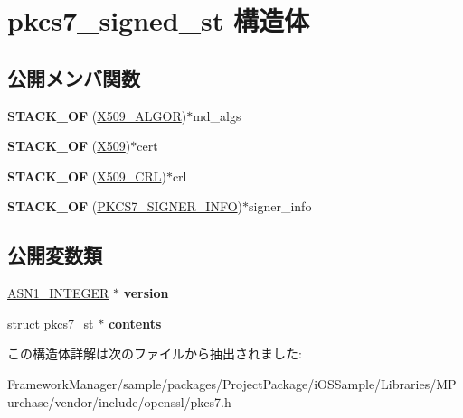 \hypertarget{structpkcs7__signed__st}{}\section{pkcs7\+\_\+signed\+\_\+st 構造体}
\label{structpkcs7__signed__st}
\subsection*{公開メンバ関数}
\begin{DoxyCompactItemize}
\item 
\hypertarget{structpkcs7__signed__st_a95443d219319ec0509277c13ada0d372}{}{\bfseries S\+T\+A\+C\+K\+\_\+\+O\+F} (\hyperlink{struct_x509__algor__st}{X509\+\_\+\+A\+L\+G\+O\+R})$\ast$md\+\_\+algs\label{structpkcs7__signed__st_a95443d219319ec0509277c13ada0d372}

\item 
\hypertarget{structpkcs7__signed__st_a458cc3ee1d42283dabf58b5e4d39f316}{}{\bfseries S\+T\+A\+C\+K\+\_\+\+O\+F} (\hyperlink{structx509__st}{X509})$\ast$cert\label{structpkcs7__signed__st_a458cc3ee1d42283dabf58b5e4d39f316}

\item 
\hypertarget{structpkcs7__signed__st_ab2c9d5399f9f26e97f8410463f167243}{}{\bfseries S\+T\+A\+C\+K\+\_\+\+O\+F} (\hyperlink{struct_x509__crl__st}{X509\+\_\+\+C\+R\+L})$\ast$crl\label{structpkcs7__signed__st_ab2c9d5399f9f26e97f8410463f167243}

\item 
\hypertarget{structpkcs7__signed__st_a02a1203d796aa79c223fe6d3d5e3619b}{}{\bfseries S\+T\+A\+C\+K\+\_\+\+O\+F} (\hyperlink{structpkcs7__signer__info__st}{P\+K\+C\+S7\+\_\+\+S\+I\+G\+N\+E\+R\+\_\+\+I\+N\+F\+O})$\ast$signer\+\_\+info\label{structpkcs7__signed__st_a02a1203d796aa79c223fe6d3d5e3619b}

\end{DoxyCompactItemize}
\subsection*{公開変数類}
\begin{DoxyCompactItemize}
\item 
\hypertarget{structpkcs7__signed__st_afca26f9f6d8c5c95f805c3c236f04904}{}\hyperlink{structasn1__string__st}{A\+S\+N1\+\_\+\+I\+N\+T\+E\+G\+E\+R} $\ast$ {\bfseries version}\label{structpkcs7__signed__st_afca26f9f6d8c5c95f805c3c236f04904}

\item 
\hypertarget{structpkcs7__signed__st_a41182027c38487c5be24e8609f4590f8}{}struct \hyperlink{structpkcs7__st}{pkcs7\+\_\+st} $\ast$ {\bfseries contents}\label{structpkcs7__signed__st_a41182027c38487c5be24e8609f4590f8}

\end{DoxyCompactItemize}


この構造体詳解は次のファイルから抽出されました\+:\begin{DoxyCompactItemize}
\item 
Framework\+Manager/sample/packages/\+Project\+Package/i\+O\+S\+Sample/\+Libraries/\+M\+Purchase/vendor/include/openssl/pkcs7.\+h\end{DoxyCompactItemize}
